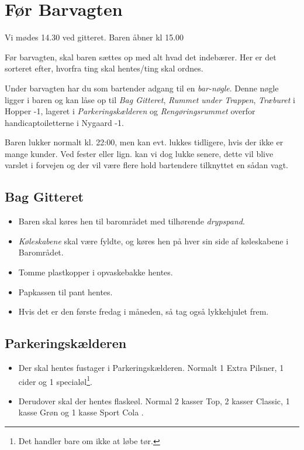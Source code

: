 \section{Før Barvagten}
\label{sec:pre-barvagten}

Vi mødes 14.30 ved gitteret. Baren åbner kl 15.00

Før barvagten, skal baren sættes op med alt hvad det indebærer. Her er
det sorteret efter, hvorfra ting skal hentes/ting skal ordnes.

Under barvagten har du som bartender adgang til en \textit{bar-nøgle}. 
Denne nøgle ligger i baren og kan låse op til \textit{Bag Gitteret}, 
\textit{Rummet under Trappen}, \textit{Træburet} i Hopper -1, 
lageret i \textit{Parkeringskælderen} og 
\textit{Rengøringsrummet} overfor handicaptoiletterne i Nygaard -1.

Baren lukker normalt kl. 22:00, men kan evt. lukkes tidligere, hvis der ikke er mange kunder.
Ved fester eller lign. kan vi dog lukke senere, dette vil blive varslet i forvejen og der vil 
være flere hold bartendere tilknyttet en sådan vagt.

\subsection{Bag Gitteret}
\label{sec:pre:bag-ved-gitteret}

\begin{itemize}
	\item Baren skal køres hen til barområdet med tilhørende \textit{drypspand}.
	\item \textit{Køleskabene} skal være fyldte, og køres hen på hver sin side af køleskabene i 
	Barområdet.
	\item Tomme plastkopper i opvaskebakke hentes.
	\item Papkassen til pant hentes.
	\item Hvis det er den første fredag i måneden, så tag også lykkehjulet frem.
\end{itemize}

\subsection{Parkeringskælderen}
\label{sec:pre:hopper}

\begin{itemize}
	\item Der skal hentes fustager i Parkeringskælderen. Normalt 1
	Extra Pilsner, 1 cider og 1 specialøl\footnote[1]{\label{note1}Det handler bare om ikke at løbe
	tør.}.
	\item Derudover skal der hentes flaskeøl. Normal 2 kasser Top, 2 kasser Classic, 
	1 kasse Grøn og 1 kasse Sport Cola \footnotemark[1].
\end{itemize}

